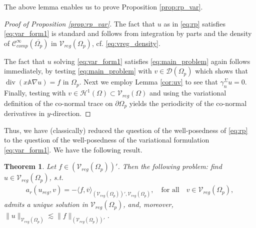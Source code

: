 \documentclass[report]{elsarticle}
\newtheorem{theorem}{Theorem}[section]
\newtheorem{remark}[theorem]{Remark}
\numberwithin{theorem}{section}
\begin{document}
The above lemma enables us to prove Proposition \ref{prop:rp_var}. 
\begin{proof}[Proof of Proposition \ref{prop:rp_var}]
	The fact that $u$ as in \eqref{eq:rp} satisfies \eqref{eq:var_form1} is standard and follows from integration by parts and the density of $\mathcal{C}^{\infty}_{comp}(\overline{\Omega_p})$ in $\mathcal{V}_{reg}(\Omega_p)$, cf. \eqref{eq:vreg_density}.
	
	
	The fact that $u$ solving \eqref{eq:var_form1} satisfies \eqref{eq:main_problem} again follows immediately, by testing \eqref{eq:main_problem} with $v\in \mathcal{D}(\Omega_p)$ which shows that 
	$\operatorname{div}(x\mathbb{A}\nabla u)=f$ in $\Omega_p$. Next we employ Lemma \ref{cor:uv} to see that $\gamma_n^{\Sigma}u=0$. Finally, testing with $v\in \mathcal{H}^1(\Omega)\subset \mathcal{V}_{reg}(\Omega)$ and using the variational definition of the co-normal trace on $\partial\Omega_p$ yields the periodicity of the co-normal derivatives in $y$-direction. 
\end{proof}
Thus, we have (classically) reduced the question of the well-posedness of \eqref{eq:rp} to the question of the well-posedness of the variational formulation \eqref{eq:var_form1}. We have the following result. 
\begin{theorem}
	\label{prop:main}
	Let $f\in \left(\mathcal{V}_{reg}(\Omega_p)\right)'$.  Then the following problem: find $u\in \mathcal{V}_{reg}(\Omega_p)$, s.t.
	\begin{align*}
		a_r(u_{reg}, v)=-\langle f, \overline{v}\rangle_{(\mathcal{V}_{reg}(\Omega_p))', \mathcal{V}_{reg}(\Omega_p)}, \quad \text{for all} \quad v\in \mathcal{V}_{reg}(\Omega_p), 
	\end{align*}
	admits a unique solution in $\mathcal{V}_{reg}(\Omega_p)$, and, moreover,  $\|u\|_{\mathcal{V}_{reg}(\Omega_p)}\lesssim \|f\|_{(\mathcal{V}_{reg}(\Omega_p))'}$.  
\end{theorem}
\end{document}
